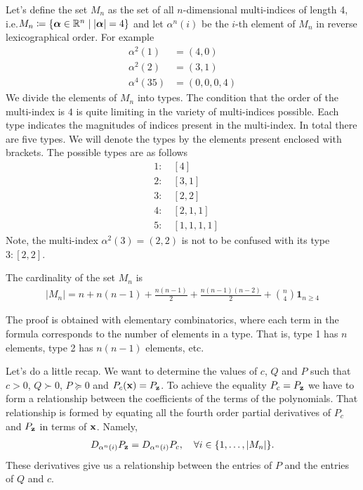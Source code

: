 \documentclass[a4paper,12pt,twoside,BCOR=10mm]{scrbook}
\begin{document}
Let's define the set $M_n$ as the set of all $n$-dimensional multi-indices of length 4, i.e.\@ $M_n \coloneqq \{\bm{\alpha} \in \mathbb{R}^{n} \mid |\bm{\alpha}| = 4\}$ and let $\alpha^n(i)$ be the $i$-th element of $M_n$ in reverse lexicographical order. For example
\begin{align*}
    \alpha^2(1) &= (4, 0)\\
    \alpha^2(2) &= (3, 1)\\
    \alpha^4(35) &= (0, 0, 0, 4)
\end{align*}
We divide the elements of $M_n$ into types. The condition that the order of the multi-index is $4$ is quite limiting in the variety of multi-indices possible. Each type indicates the magnitudes of indices present in the multi-index. In total there are five types. We will denote the types by the elements present enclosed with brackets. The possible types are as follows
\begin{align*}
    &1:\quad [4]\\
    &2:\quad [3,1]\\
    &3:\quad [2,2]\\
    &4:\quad [2,1,1]\\
    &5:\quad [1,1,1,1]
\end{align*}
Note, the multi-index $\alpha^2(3) = (2,2)$ is not to be confused with its type $3: [2,2]$.

\begin{theorem}\label{ThmCardinalityOfMn}
The cardinality of the set $M_n$ is
\begin{align*}
    |M_n| = n + n(n - 1) + \frac{n(n - 1)}{2} + \frac{n(n - 1)(n - 2)}{2} + \binom{n}{4}\mathbf{1}_{n\geq 4}
\end{align*}
\end{theorem}
The proof is obtained with elementary combinatorics, where each term in the formula corresponds to the number of elements in a type. That is, type 1 has $n$ elements, type 2 has $n(n - 1)$ elements, etc.

Let's do a little recap. We want to determine the values of $c$, $Q$ and $P$ such that $c > 0$, $Q \succ 0$, $P \succeq 0$ and $P_c(\mathbf{x}) = P_{\mathbf{z}}$. To achieve the equality $P_c = P_{\mathbf{z}}$ we have to form a relationship between the coefficients of the terms of the polynomials. That relationship is formed by equating all the fourth order partial derivatives of $P_c$ and $P_{\mathbf{z}}$ in terms of $\mathbf{x}$. Namely,
\begin{align}\label{RelationsGeneralCase}
    D_{\alpha^n(i)} P_{\mathbf{z}} = D_{\alpha^n(i)} P_c, \quad \forall i\in\{1,\ldots,  |M_n|\}.
\end{align}
These derivatives give us a relationship between the entries of $P$ and the entries of $Q$ and $c$.
\end{document}

